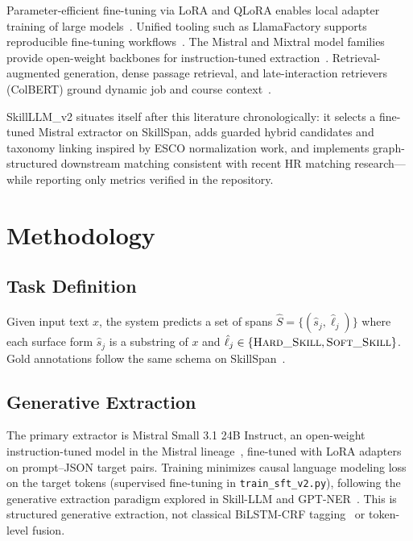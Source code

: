\documentclass[12pt,oneside]{report}
\begin{document}
Parameter-efficient fine-tuning via LoRA and QLoRA enables local adapter training of large models~\cite{hu2022lora,dettmers2023qlora}.
Unified tooling such as LlamaFactory supports reproducible fine-tuning workflows~\cite{zheng2024llamafactory}.
The Mistral and Mixtral model families provide open-weight backbones for instruction-tuned extraction~\cite{jiang2023mistral,jiang2024mixtral}.
Retrieval-augmented generation, dense passage retrieval, and late-interaction retrievers (ColBERT) ground dynamic job and course context~\cite{lewis2020rag,karpukhin2020dpr,khattab2020colbert}.

SkillLLM\_v2 situates itself after this literature chronologically: it selects a fine-tuned Mistral extractor on SkillSpan, adds guarded hybrid candidates and taxonomy linking inspired by ESCO normalization work, and implements graph-structured downstream matching consistent with recent HR matching research---while reporting only metrics verified in the repository.

\chapter{Methodology}
\label{ch:method}

\section{Task Definition}

Given input text $x$, the system predicts a set of spans $\hat{S} = \{(\hat{s}_j, \hat{\ell}_j)\}$ where each surface form $\hat{s}_j$ is a substring of $x$ and $\hat{\ell}_j \in \{\textsc{Hard\_Skill}, \textsc{Soft\_Skill}\}$.
Gold annotations follow the same schema on SkillSpan~\cite{zhang2022skillspan}.

\section{Generative Extraction}

The primary extractor is Mistral Small 3.1 24B Instruct, an open-weight instruction-tuned model in the Mistral lineage~\cite{jiang2023mistral}, fine-tuned with LoRA adapters~\cite{hu2022lora,dettmers2023qlora} on prompt--JSON target pairs.
Training minimizes causal language modeling loss on the target tokens (supervised fine-tuning in \texttt{train\_sft\_v2.py}), following the generative extraction paradigm explored in Skill-LLM and GPT-NER~\cite{herandi2024skillllm,wang2023gptner}.
This is structured generative extraction, not classical BiLSTM-CRF tagging~\cite{huang2015bilstmcrf} or token-level fusion.
\end{document}
